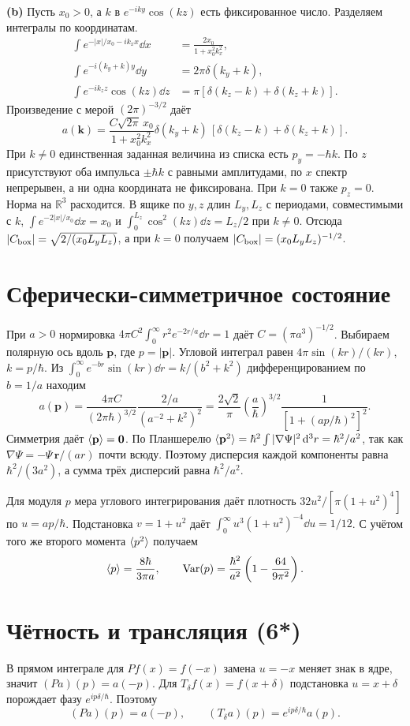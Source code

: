 \documentclass[11pt,a4paper]{article}
\begin{document}
\textbf{(b)} Пусть \(x_0>0\), а \(k\) в \(e^{-iky}\cos(kz)\)
есть фиксированное число. Разделяем интегралы по координатам.
\begin{align*}
 \int e^{-|x|/x_0-ik_xx}\dd x&=\frac{2x_0}{1+x_0^2k_x^2},\\
 \int e^{-i(k_y+k)y}\dd y&=2\pi\delta(k_y+k),\\
 \int e^{-ik_zz}\cos(kz)\dd z&=\pi[\delta(k_z-k)+\delta(k_z+k)].
\end{align*}
Произведение с мерой \((2\pi)^{-3/2}\) даёт
\[
 a(\mathbf k)=\frac{C\sqrt{2\pi}\,x_0}{1+x_0^2 k_x^2}
             \delta(k_y+k)\,[\delta(k_z-k)+\delta(k_z+k)].
\]
При \(k\ne0\) единственная заданная величина из списка
есть \(p_y=-\hbar k\). По \(z\) присутствуют оба импульса
\(\pm\hbar k\) с равными амплитудами, по \(x\) спектр непрерывен,
а ни одна координата не фиксирована. При \(k=0\) также \(p_z=0\).
Норма на \(\mathbb R^3\) расходится. В ящике по \(y,z\)
длин \(L_y,L_z\) с периодами, совместимыми с \(k\),
\(\int e^{-2|x|/x_0}\dd x=x_0\) и
\(\int_0^{L_z}\cos^2(kz)\dd z=L_z/2\) при \(k\ne0\).
Отсюда \(|C_{\rm box}|=\sqrt{2/(x_0L_yL_z)}\), а при \(k=0\)
получаем \(|C_{\rm box}|=(x_0L_yL_z)^{-1/2}\).

\section{Сферически-симметричное состояние}

При \(a>0\) нормировка \(4\pi C^2\int_0^\infty r^2e^{-2r/a}\dd r=1\)
даёт \(C=(\pi a^3)^{-1/2}\). Выбираем полярную ось вдоль
\(\mathbf p\), где \(p=|\mathbf p|\). Угловой интеграл равен
\(4\pi\sin(kr)/(kr)\), \(k=p/\hbar\).
Из \(\int_0^\infty e^{-br}\sin(kr)\dd r=k/(b^2+k^2)\)
дифференцированием по \(b=1/a\) находим
\[
 a(\mathbf p)=\frac{4\pi C}{(2\pi\hbar)^{3/2}}
                \frac{2/a}{(a^{-2}+k^2)^2}
       =\frac{2\sqrt2}{\pi}\left(\frac a\hbar\right)^{3/2}
                \frac1{[1+(ap/\hbar)^2]^2}.
\]
Симметрия даёт \(\langle \mathbf p\rangle=\mathbf0\). По Планшерелю
\(\langle \mathbf p^2\rangle=\hbar^2\int|\nabla\Psi|^2\mathop{}\!\mathrm{d}^3r
=\hbar^2/a^2\), так как \(\nabla\Psi=-\Psi\,\mathbf r/(ar)\)
почти всюду. Поэтому дисперсия каждой компоненты равна
\(\hbar^2/(3a^2)\), а сумма трёх дисперсий равна \(\hbar^2/a^2\).

Для модуля \(p\) мера углового интегрирования даёт
плотность \(32u^2/[\pi(1+u^2)^4]\) по \(u=ap/\hbar\).
Подстановка \(v=1+u^2\) даёт
\(\int_0^\infty u^3(1+u^2)^{-4}\dd u=1/12\).
С учётом того же второго момента \(\langle p^2\rangle\)
получаем
\[
 \langle p\rangle=\frac{8\hbar}{3\pi a},\qquad
 \operatorname{Var}(p)=\frac{\hbar^2}{a^2}\left(1-\frac{64}{9\pi^2}\right).
\]

\section{Чётность и трансляция (6*)}

В прямом интеграле для \(Pf(x)=f(-x)\) замена \(u=-x\)
меняет знак в ядре, значит \((Pa)(p)=a(-p)\).
Для \(T_\delta f(x)=f(x+\delta)\) подстановка \(u=x+\delta\)
порождает фазу \(e^{ip\delta/\hbar}\). Поэтому
\[
 (Pa)(p)=a(-p),\qquad (T_\delta a)(p)=e^{ip\delta/\hbar}a(p).
\]
\end{document}
